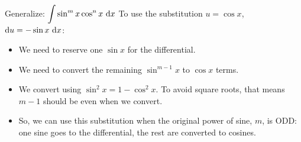 \begin{frame}{Generalize: $\displaystyle\int \sin^m x\cos^nx~\textup{\text{d}} x$}
To use the substitution \textcolor{M3}{$u=\cos x$},~\textcolor{C3}{ $\text{d} u=-\sin x ~\text{d} x$}:
\pause
\begin{itemize}[<+->]
\item We need to \textcolor{C3}{reserve} one \textcolor{C3}{$\sin x$} for the differential.
\item We need to \textcolor{M3}{convert} the remaining \textcolor{M3}{$\sin^{m-1} x$} to \textcolor{M3}{$\cos x$} terms.
\item We convert using \textcolor{M4}{$\sin^2 x = 1-\cos^2 x$}. To avoid square roots, that means $ m-1$  should be \textcolor{M4}{even when we convert}.
\item \textcolor{W1}{So, we can use this substitution when the original power of sine, $m$, is ODD: one sine goes to the differential, the rest are converted to cosines.}
\end{itemize}
\end{frame}

